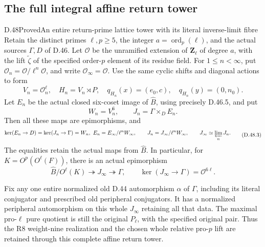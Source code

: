 \subsection{The full integral affine return tower}

\begin{statement}{D.48}{Proved}{An entire return-prime lattice tower with its literal inverse-limit fibre}
Retain the distinct primes \(\ell,p\geq5\), the integer
\(a=\operatorname{ord}_p(\ell)\), and the actual sources
\(\Gamma,D\) of D.46. Let \(\mathcal O\) be the
unramified extension of \(\mathbf Z_\ell\) of degree \(a\),
with the lift \(\widetilde\zeta\) of the specified
order-\(p\) element of its residue field. For
\(1\leq n<\infty\), put
\(\mathcal O_n=\mathcal O/\ell^n\mathcal O\), and
write \(\mathcal O_\infty=\mathcal O\).
Use the same cyclic shifts and diagonal actions to form
\[
 V_n=\mathcal O_n^\ell,\quad
 H_n=V_n\rtimes P,\quad
 q_{H_n}(x)=(e_0,c),\quad q_{H_n}(y)=(0,n_0).
 \tag{D.48.1}
\]
Let \(E_n\) be the actual closed six-coset image of
\(\widehat B\), using precisely D.46.5, and put
\[
 W_n=V_n^6,\qquad J_n=\Gamma\mathbin{\times_D}E_n.
 \tag{D.48.2}
\]
Then all these maps are epimorphisms, and
\[
 \begin{gathered}
 \ker(E_n\to D)=\ker(J_n\to\Gamma)=W_n,\
 E_n=E_\infty/\ell^nW_\infty,\qquad
 J_n=J_\infty/\ell^nW_\infty,\qquad
 J_\infty\simeq\varprojlim_nJ_n.
 \end{gathered}
 \tag{D.48.3}
\]
The equalities retain the actual maps from \(\widehat B\).
In particular, for \(K=O^p(O^\ell(F))\), there is an
actual epimorphism
\[
 \widehat B/O^\ell(K)\twoheadrightarrow J_\infty
       \twoheadrightarrow\Gamma,
 \qquad\ker(J_\infty\to\Gamma)
          =\mathcal O^{6\ell}.
 \tag{D.48.4}
\]

Fix any one entire normalized old D.44 automorphism
\(\alpha\) of \(\Gamma\), including its literal
conjugator and prescribed old peripheral conjugators.
It has a normalized peripheral automorphism on this
whole \(J_\infty\) retaining all that data.
The maximal pro-\(\ell\) pure quotient is still the
original \(P_\ell\), with the specified original pair.
Thus the R8 weight-nine realization and the chosen
whole relative pro-\(p\) lift are retained through
this complete affine return tower.


\end{statement}
